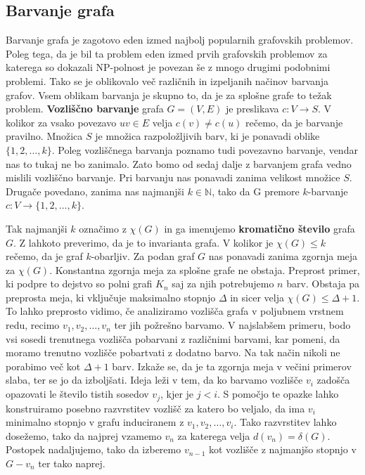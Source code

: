 \documentclass[12pt,a4paper,twoside]{article}
\theoremstyle{definition} %
\theoremstyle{plain} %
\numberwithin{equation}{section}  %
\begin{document}
\subsection{Barvanje grafa}
Barvanje grafa je zagotovo eden izmed najbolj popularnih grafovskih problemov. Poleg tega, da je bil ta problem eden izmed prvih grafovskih problemov za katerega so dokazali NP-polnost je povezan še z mnogo drugimi podobnimi problemi. Tako se je oblikovalo več različnih in izpeljanih načinov barvanja grafov. Vsem oblikam barvanja je skupno to, da je za splošne grafe to težak problem.
\textbf{Vozliščno barvanje} grafa $G=(V, E)$ je preslikava $ c: V \rightarrow S$. V kolikor za vsako povezavo $uv \in E$ velja $c(v) \neq c(u)$ rečemo, da je barvanje pravilno. Množica $S$ je množica razpoložljivih barv, ki je ponavadi oblike $ \{1,2,\ldots, k\}$. Poleg vozliščnega barvanja poznamo tudi povezavno barvanje, vendar nas to tukaj ne bo zanimalo. Zato bomo od sedaj dalje z barvanjem grafa vedno mislili vozliščno barvanje. Pri barvanju nas ponavadi zanima velikost množice $S$. Drugače povedano, zanima nas najmanjši $k \in \mathbb{N}$, tako da G premore $k$-barvanje $c : V \rightarrow \{1,2,\ldots, k\}$. 

Tak najmanjši $k$ označimo z $\chi(G)$ in ga imenujemo \textbf{kromatično število} grafa $G$. Z lahkoto preverimo, da je to invarianta grafa. V kolikor je $ \chi(G) \le k$ rečemo, da je graf $k$-obarljiv. Za podan graf $G$ nas ponavadi zanima zgornja meja za  $\chi(G)$. Konstantna zgornja meja za splošne grafe ne obstaja. Preprost primer, ki podpre to dejstvo so polni grafi $K_n$ saj za njih potrebujemo $n$ barv. Obstaja pa preprosta meja, ki vključuje maksimalno stopnjo $\Delta$ in sicer velja  $\chi(G) \le \Delta + 1$. To lahko preprosto vidimo, če analiziramo vozlišča grafa v poljubnem vrstnem redu, recimo $v_1, v_2, \dots, v_n$ ter jih požrešno barvamo. V najslabšem primeru, bodo vsi sosedi trenutnega vozlišča pobarvani z različnimi barvami, kar pomeni, da moramo trenutno vozlišče pobartvati z dodatno barvo. Na tak način nikoli ne porabimo več kot $\Delta + 1$ barv. Izkaže se, da je ta zgornja meja v večini primerov slaba, ter se jo da izboljšati. Ideja leži v tem, da ko barvamo vozlišče $v_i$ zadošča opazovati le število tistih sosedov $v_j$, kjer je $j < i$. S pomočjo te opazke lahko konstruiramo posebno razvrstitev vozlišč za katero bo veljalo, da ima $v_i$ minimalno stopnjo v grafu induciranem z $v_1, v_2, \ldots, v_i$. Tako razvrstitev lahko dosežemo, tako da najprej vzamemo $v_n$ za katerega velja $d(v_n) = \delta(G)$. Postopek nadaljujemo, tako da izberemo $v_{n-1}$ kot vozlišče z najmanjšo stopnjo v $G - v_n$ ter tako naprej.
\end{document}
